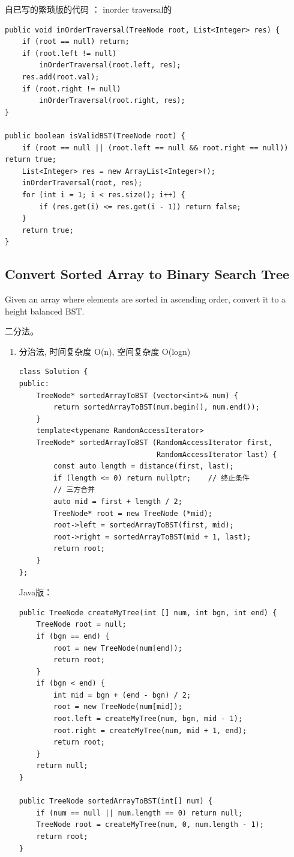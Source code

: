 \documentclass[12pt]{book}
\begin{document}
自已写的繁琐版的代码 ： inorder traversal的
\lstset{language=java,label= ,caption= ,numbers=none}
\begin{lstlisting}
public void inOrderTraversal(TreeNode root, List<Integer> res) {
    if (root == null) return;
    if (root.left != null)
        inOrderTraversal(root.left, res);
    res.add(root.val);
    if (root.right != null)
        inOrderTraversal(root.right, res);
}

public boolean isValidBST(TreeNode root) {
    if (root == null || (root.left == null && root.right == null)) return true;
    List<Integer> res = new ArrayList<Integer>();
    inOrderTraversal(root, res);
    for (int i = 1; i < res.size(); i++) {
        if (res.get(i) <= res.get(i - 1)) return false;
    }
    return true;
}
\end{lstlisting}

\subsection{Convert Sorted Array to Binary Search Tree}
\label{sec-4-4-2}
Given an array where elements are sorted in ascending order, convert it to a height balanced BST.

二分法。

\begin{enumerate}
\item 分治法, 时间复杂度 O(n), 空间复杂度 O(logn)
\label{sec-4-4-2-1}

\lstset{language=java,label= ,caption= ,numbers=none}
\begin{lstlisting}
class Solution {
public:
    TreeNode* sortedArrayToBST (vector<int>& num) {
        return sortedArrayToBST(num.begin(), num.end());
    }
    template<typename RandomAccessIterator>
    TreeNode* sortedArrayToBST (RandomAccessIterator first,
                                RandomAccessIterator last) {
        const auto length = distance(first, last);
        if (length <= 0) return nullptr;    // 终止条件
        // 三方合并
        auto mid = first + length / 2;
        TreeNode* root = new TreeNode (*mid);
        root->left = sortedArrayToBST(first, mid);
        root->right = sortedArrayToBST(mid + 1, last);
        return root;
    }
};
\end{lstlisting}

Java版：

\lstset{language=java,label= ,caption= ,numbers=none}
\begin{lstlisting}
public TreeNode createMyTree(int [] num, int bgn, int end) {
    TreeNode root = null;
    if (bgn == end) {
        root = new TreeNode(num[end]);
        return root;
    }
    if (bgn < end) {
        int mid = bgn + (end - bgn) / 2;
        root = new TreeNode(num[mid]);
        root.left = createMyTree(num, bgn, mid - 1);
        root.right = createMyTree(num, mid + 1, end);
        return root;
    }
    return null;
}

public TreeNode sortedArrayToBST(int[] num) {
    if (num == null || num.length == 0) return null;
    TreeNode root = createMyTree(num, 0, num.length - 1);
    return root;
}
\end{lstlisting}
\end{enumerate}
\end{document}
